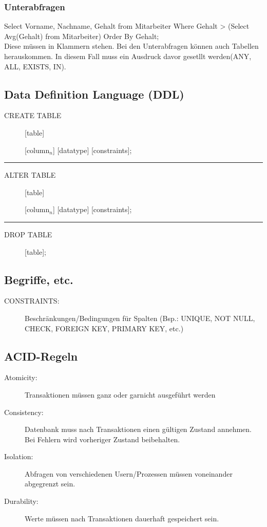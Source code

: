 \documentclass[12pt,a4paper]{article}
\begin{document}
		\subsubsection{Unterabfragen}
			Select Vorname, Nachname, Gehalt from Mitarbeiter Where Gehalt > (Select Avg(Gehalt) from Mitarbeiter) Order By Gehalt;\\
			Diese müssen in Klammern stehen. Bei den Unterabfragen können auch Tabellen herauskommen. In diesem Fall muss ein Ausdruck davor gesetllt werden(ANY, ALL, EXISTS, IN).

	\subsection{Data Definition Language (DDL)}
		\begin{description}
			\item[CREATE TABLE] [table] 
			\item[][column$_n$] [datatype] [constraints];
		\end{description}
		\par\noindent\rule{\textwidth}{0.4pt}
		\begin{description}
			\item[ALTER TABLE] [table] 
			\item[][column$_n$] [datatype] [constraints];
		\end{description}
		\par\noindent\rule{\textwidth}{0.4pt}
		\begin{description}
			\item[DROP TABLE] [table];
		\end{description}


	\subsection{Begriffe, etc.}
		\begin{description}
			\item[CONSTRAINTS:] Beschränkungen/Bedingungen für Spalten (Bsp.: UNIQUE, NOT NULL, CHECK, FOREIGN KEY, PRIMARY KEY, etc.)
			\item[]  
		\end{description}

	\subsection{ACID-Regeln}
		\begin{description}
			\item[Atomicity:] Transaktionen müssen ganz oder garnicht ausgeführt werden
			\item[Consistency:] Datenbank muss nach Transaktionen einen gültigen Zustand annehmen. 
			Bei Fehlern wird vorheriger Zustand beibehalten.
			\item[Isolation:] Abfragen von verschiedenen Usern/Prozessen müssen voneinander abgegrenzt sein.
			\item[Durability:] Werte müssen nach Transaktionen dauerhaft gespeichert sein.   
		\end{description}
\end{document}
